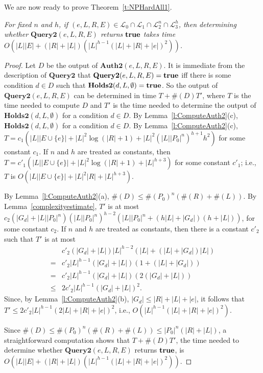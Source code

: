 \documentclass{acmtrans2m}
\newcommand{\prf}{\begin{proof}}
\newcommand{\eprf}{\end{proof}}
\newenvironment{RETHM}[2]{\trivlist \item[\hskip 10pt\hskip\labelsep{\sc #1\hskip 5pt\relax\ref{#2}.}]\it}{\endtrivlist}
\newcommand{\rethm}[1]{\begin{RETHM}{Theorem}{#1}}
\newcommand{\erethm}{\end{RETHM}}
\newcommand{\othm}{\rethm}
\newcommand{\eothm}{\erethm}
\newcommand{\<}{
}
\renewcommand{\>}{\rangle}
\newcommand{\union}{\cup}
\newcommand{\cL}{\mathcal{L}}
\newcommand{\len}[1]{|#1|}
\newcommand{\card}[1]{\#({#1})}
\newcommand{\true}{\mathit{\bf{true}}}
\newcommand{\cd}{d}
\newcommand{\cc}{e}
\newcommand{\scc}{E}
\newcommand{\XProcTwo}{\textbf{Query2}}
\newcommand{\CMetTwo}{\textbf{Holds2}}
\newcommand{\XATwo}{\textbf{Auth2}}
\newcommand{\numP}{n}
\newcommand{\lenC}{h}
\begin{document}
We are now ready to prove Theorem~\ref{t:NPHardAll1}.
\othm{t:NPHardAll1}
For fixed $n$ and $h$, if $(\cc, L, R, \scc) \in\cL_0\cap\cL_1\cap\cL_2^{\numP}\cap\cL_3^{\lenC}$,
then determining whether $\XProcTwo(\cc, L, R, \scc)$ returns $\true$ takes time
$O(\len{L}\len{E} + (\len{R} + \len{L})(\len{L}^{h-1}(\len{L} + \len{R}+ \len{\cc})^2))$.
\eothm
\begin{sloppypar}
\prf
Let $D$ be the output of $\XATwo(\cc, L, R, \scc)$.  It is immediate from the description of
$\XProcTwo$ that $\XProcTwo(\cc, L, R, \scc) = \true$ iff there is some condition $\cd\in D$
such that $\CMetTwo(\cd, L, \emptyset) = \true$.  So the output of $\XProcTwo(\cc, L, R, \scc)$
can be determined in time $T + \card{D}T'$, where $T$ is the time needed to compute $D$ and
$T'$ is the time needed to determine the output of $\CMetTwo(\cd, L, \emptyset)$ for a condition
$\cd\in D$.  By Lemma~\ref{l:ComputeAuth2}(c),
$\CMetTwo(\cd, L, \emptyset)$ for a condition $\cd\in D$.  By Lemma~\ref{l:ComputeAuth2}(c),
$
T = c_1(\len{L}\len{E\union\{\cc\}} + \len{L}^2\log(\len{R} + 1) + \len{L}^2(\len{L}\len{P_0}^n)^{h+1}h^2)
$
for some constant $c_1$.  If $n$ and $h$ are treated as constants, then
$T = c'_1(\len{L}\len{E\union\{\cc\}} + \len{L}^2\log(\len{R} + 1) + \len{L}^{h+3})$ for some constant $c'_1$;
i.e., $T$ is $O(\len{L}\len{E\union\{\cc\}} + \len{L}^2\len{R} + \len{L}^{h+3})$.

By Lemma~\ref{l:ComputeAuth2}(a), $\card{D} \le \card{P_0}^n(\card{R}+\card{L})$.
By Lemma~\ref{complexityestimate}, $T'$ is at most
$c_2(\len{G_d}+\len{L}\len{P_0}^n)(\len{L}\len{P_0}^n)^{h-2}(\len{L}\len{P_0}^n + (h\len{L} +\len{G_d})
(h + \len{L}))$, for some constant $c_2$.  If $n$ and $h$ are treated as constants, then there is a
constant $c'_2$ such that $T'$ is at most
$$
\begin{array}{ll}
& c'_2(\len{G_d}+\len{L})\len{L}^{h-2}(\len{L} + (\len{L} +\len{G_d})\len{L})\\
= & c'_2\len{L}^{h-1}(\len{G_d}+\len{L})(1 + (\len{L} +\len{G_d}))\\
= & c'_2\len{L}^{h-1}(\len{G_d}+\len{L})(2(\len{G_d}+\len{L}))\\
\le & 2c'_2\len{L}^{h-1}(\len{G_d}+\len{L})^2.
\end{array}
$$
Since, by Lemma~\ref{l:ComputeAuth2}(b), $\len{G_d} \le \len{R}+\len{L}+\len{\cc}$, it follows that
$T' \le 2c'_2\len{L}^{h-1}(2\len{L} + \len{R} + \len{\cc})^2$,
i.e., $O(\len{L}^{h-1}(\len{L} + \len{R} + \len{\cc})^2)$.

Since $\card{D} \le \card{P_0}^n(\card{R}+\card{L}) \le \len{P_0}^n(\len{R} + \len{L})$, a
straightforward computation shows that $T + \card{D}T'$, the time needed to determine whether
$\XProcTwo(\cc, L, R, \scc)$ returns $\true$, is
$O(\len{L}\len{E} + (\len{R} + \len{L})(\len{L}^{h-1}(\len{L} + \len{R}
+ \len{\cc})^2))$.
\eprf
\end{sloppypar}
\end{document}
